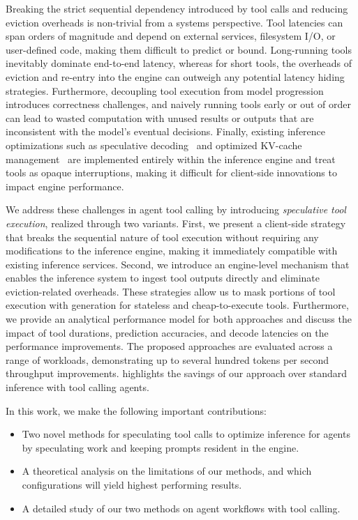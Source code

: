 Breaking the strict sequential dependency introduced by tool calls and reducing eviction overheads is non-trivial from a systems perspective.
Tool latencies can span orders of magnitude and depend
on external services, filesystem I/O, or user-defined code, making them
difficult to predict or bound.  
Long-running tools inevitably dominate end-to-end latency, whereas for short tools, the overheads of eviction and re-entry into the engine can outweigh any potential latency hiding strategies.
Furthermore, decoupling tool execution from model progression introduces correctness challenges, and naively running tools early or out of order can lead to wasted computation with unused results or outputs that are inconsistent with the model’s eventual decisions.
Finally, existing inference optimizations such as speculative decoding~\cite{leviathan_fast_2023, chen2023accelerating} and optimized KV-cache management~\cite{kwon2023efficient}
are implemented entirely within the inference engine and treat tools as opaque
interruptions, making it difficult for client-side innovations to impact
engine performance.


We address these challenges in agent tool calling by introducing \emph{speculative tool execution}, realized through two variants. First, we present a client-side strategy that breaks the sequential nature of tool execution without requiring any modifications to the inference engine, making it immediately compatible with existing inference services. Second, we introduce an engine-level mechanism that enables the inference system to ingest tool outputs directly and eliminate eviction-related overheads. These strategies allow us to mask portions of tool execution with generation for stateless and cheap-to-execute tools.
Furthermore, we provide an analytical performance model for both approaches and discuss the impact of tool durations, prediction accuracies,
and decode latencies on the performance improvements. The proposed
approaches are evaluated across a range of workloads, demonstrating up to
several hundred tokens per second throughput improvements.
 highlights the savings of our approach over standard inference with tool calling agents.

In this work, we make the following important contributions:
\begin{itemize}
    \item Two novel methods for speculating tool calls to optimize inference for agents by speculating work and keeping prompts resident in the engine.
    \item A theoretical analysis on the limitations of our methods, and which configurations will yield highest performing results.
    \item A detailed study of our two methods on agent workflows with tool calling.
\end{itemize}
